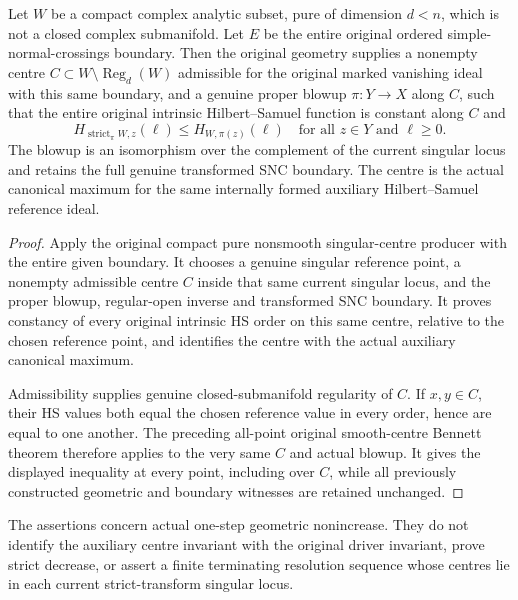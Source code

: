 \begin{theorem}
\label{hir:actual-original-singular-centre-proper-bennett-blowup}
\leanok
Let $W$ be a compact complex analytic subset, pure of dimension
$d<n$, which is not a closed complex submanifold. Let $E$ be
the entire original ordered simple-normal-crossings boundary.
Then the original geometry supplies a nonempty centre
$C\subset W\setminus\operatorname{Reg}_d(W)$ admissible for
the original marked vanishing ideal with this same boundary,
and a genuine proper blowup $\pi:Y\to X$ along $C$, such that
the entire original intrinsic Hilbert--Samuel function is
constant along $C$ and
\[
 H_{\operatorname{strict}_\pi W,z}(\ell)
 \le H_{W,\pi(z)}(\ell)
 \quad\text{for all }z\in Y\text{ and }\ell\ge0.
\]
The blowup is an isomorphism over the complement of the current
singular locus and retains the full genuine transformed SNC
boundary. The centre is the actual canonical maximum for the
same internally formed auxiliary Hilbert--Samuel reference ideal.
\end{theorem}
\begin{proof}
Apply the original compact pure nonsmooth singular-centre
producer with the entire given boundary. It chooses a genuine
singular reference point, a nonempty admissible centre $C$
inside that same current singular locus, and the proper
blowup, regular-open inverse and transformed SNC boundary.
It proves constancy of every original intrinsic HS order
on this same centre, relative to the chosen reference point,
and identifies the centre with the actual auxiliary canonical
maximum.

Admissibility supplies genuine closed-submanifold regularity
of $C$. If $x,y\in C$, their HS values both equal the chosen
reference value in every order, hence are equal to one another.
The preceding all-point original smooth-centre Bennett theorem
therefore applies to the very same $C$ and actual blowup.
It gives the displayed inequality at every point, including
over $C$, while all previously constructed geometric and
boundary witnesses are retained unchanged.
\end{proof}

\begin{remark}
The assertions concern actual one-step geometric nonincrease.
They do not identify the auxiliary centre invariant with the
original driver invariant, prove strict decrease, or assert a
finite terminating resolution sequence whose centres lie in
each current strict-transform singular locus.
\end{remark}
